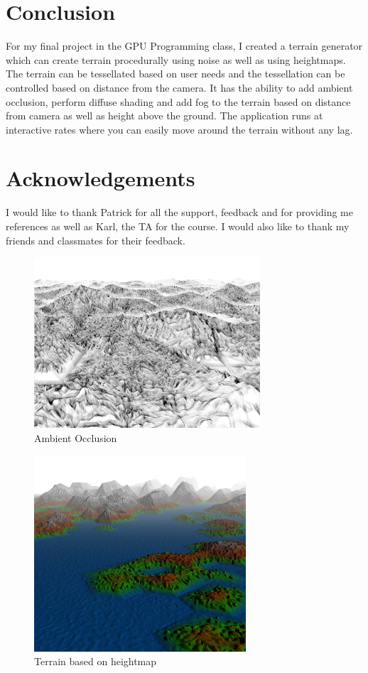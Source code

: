 \documentclass[annual]{acmsiggraph}
\begin{document}
\section{Conclusion}
For my final project in the GPU Programming class, I created a terrain generator which can create terrain procedurally using noise as well as using heightmaps. The terrain can be tessellated based on user needs and the tessellation can be controlled based on distance from the camera. It has the ability to add ambient occlusion, perform diffuse shading and add fog to the terrain based on distance from camera as well as height above the ground. The application runs at interactive rates where you can easily move around the terrain without any lag.


\section*{Acknowledgements}
I would like to thank Patrick for all the support, feedback and for providing me references as well as Karl, the TA for the course. I would also like to thank my friends and classmates for their feedback.





\begin{figure}[]
  \centering
  \includegraphics[height=2.5in]{images/AmbientOcclusion.png}
  \caption{Ambient Occlusion}
  \label{fig:ambientOcclusion}
\end{figure}

\begin{figure}[]
  \centering
  \includegraphics[width=3.1in]{images/NorwayTerrrain1_Heightmap.png}
  \caption{Terrain based on heightmap}
  \label{fig:heightmapTerrain}
\end{figure}
\end{document}
